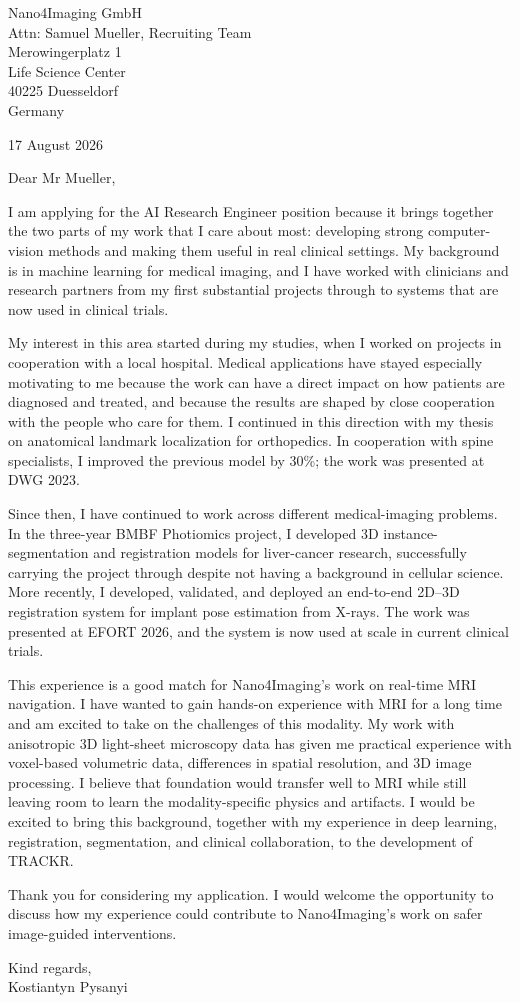 \documentclass[11pt,a4paper]{article}
\begin{document}
Nano4Imaging GmbH\\
Attn: Samuel Mueller, Recruiting Team\\
Merowingerplatz 1\\
Life Science Center\\
40225 Duesseldorf\\
Germany

\begin{flushright}
17 August 2026
\end{flushright}

Dear Mr Mueller,

I am applying for the AI Research Engineer position because it brings together the two parts of my work that I care about most: developing strong computer-vision methods and making them useful in real clinical settings. My background is in machine learning for medical imaging, and I have worked with clinicians and research partners from my first substantial projects through to systems that are now used in clinical trials.

My interest in this area started during my studies, when I worked on projects in cooperation with a local hospital. Medical applications have stayed especially motivating to me because the work can have a direct impact on how patients are diagnosed and treated, and because the results are shaped by close cooperation with the people who care for them. I continued in this direction with my thesis on anatomical landmark localization for orthopedics. In cooperation with spine specialists, I improved the previous model by 30\%; the work was presented at DWG 2023.

Since then, I have continued to work across different medical-imaging problems. In the three-year BMBF Photiomics project, I developed 3D instance-segmentation and registration models for liver-cancer research, successfully carrying the project through despite not having a background in cellular science. More recently, I developed, validated, and deployed an end-to-end 2D--3D registration system for implant pose estimation from X-rays. The work was presented at EFORT 2026, and the system is now used at scale in current clinical trials.

This experience is a good match for Nano4Imaging's work on real-time MRI navigation. I have wanted to gain hands-on experience with MRI for a long time and am excited to take on the challenges of this modality. My work with anisotropic 3D light-sheet microscopy data has given me practical experience with voxel-based volumetric data, differences in spatial resolution, and 3D image processing. I believe that foundation would transfer well to MRI while still leaving room to learn the modality-specific physics and artifacts. I would be excited to bring this background, together with my experience in deep learning, registration, segmentation, and clinical collaboration, to the development of TRACKR.

Thank you for considering my application. I would welcome the opportunity to discuss how my experience could contribute to Nano4Imaging's work on safer image-guided interventions.

Kind regards,\\
Kostiantyn Pysanyi
\end{document}
